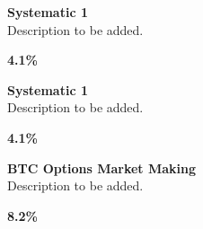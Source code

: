 \documentclass[11pt]{article}
\begin{document}
\begin{tcolorbox}[colback=cardbg, colframe=cardborder, boxrule=0.5pt, arc=4pt, left=6pt, right=6pt, top=6pt, bottom=6pt]
    \begin{minipage}[c]{0.82\linewidth}
        \textbf{\textcolor{primary}{Systematic 1}} \\[4pt]
        \textcolor{primary}{Description to be added.}
    \end{minipage}%
    \hfill
    \begin{minipage}[c]{0.15\linewidth}
        \centering
        \textbf{\Large \textcolor{accent}{4.1\%}}
    \end{minipage}
\end{tcolorbox}

\begin{tcolorbox}[colback=cardbg, colframe=cardborder, boxrule=0.5pt, arc=4pt, left=6pt, right=6pt, top=6pt, bottom=6pt]
    \begin{minipage}[c]{0.82\linewidth}
        \textbf{\textcolor{primary}{Systematic 1}} \\[4pt]
        \textcolor{primary}{Description to be added.}
    \end{minipage}%
    \hfill
    \begin{minipage}[c]{0.15\linewidth}
        \centering
        \textbf{\Large \textcolor{accent}{4.1\%}}
    \end{minipage}
\end{tcolorbox}

\begin{tcolorbox}[colback=cardbg, colframe=cardborder, boxrule=0.5pt, arc=4pt, left=6pt, right=6pt, top=6pt, bottom=6pt]
    \begin{minipage}[c]{0.82\linewidth}
        \textbf{\textcolor{primary}{BTC Options Market Making}} \\[4pt]
        \textcolor{primary}{Description to be added.}
    \end{minipage}%
    \hfill
    \begin{minipage}[c]{0.15\linewidth}
        \centering
        \textbf{\Large \textcolor{accent}{8.2\%}}
    \end{minipage}
\end{tcolorbox}

\clearpage
\end{document}
